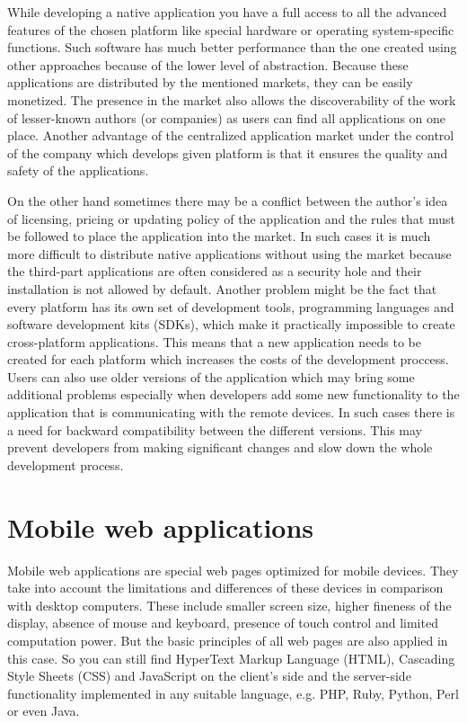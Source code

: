 \documentclass[12pt,oneside,final]{fithesis2}
\begin{document}
While developing a native application you have a full access to all the advanced features of the chosen platform like special hardware or operating system-specific functions.
Such software has much better performance than the one created using other approaches because of the lower level of abstraction.
Because these applications are distributed by the mentioned markets, they can be easily monetized.
The presence in the market also allows the discoverability of the work of lesser-known authors (or companies) as users can find all applications on one place.
Another advantage of the centralized application market under the control of the company which develops given platform is that it ensures the quality and safety of the applications.

On the other hand sometimes there may be a conflict between the author's idea of licensing, pricing or updating policy of the application and the rules that must be followed to place the application into the market.
In such cases it is much more difficult to distribute native applications without using the market because the third-part applications are often considered as a security hole and their installation is not allowed by default.
Another problem might be the fact that every platform has its own set of development tools, programming languages and software development kits (SDKs), which make it practically impossible to create cross-platform applications.
This means that a new application needs to be created for each platform which increases the costs of the development proccess.
Users can also use older versions of the application which may bring some additional problems especially when developers add some new functionality to the application that is communicating with the remote devices.
In such cases there is a need for backward compatibility between the different versions.
This may prevent developers from making significant changes and slow down the whole development process.

\section{Mobile web applications}
Mobile web applications are special web pages optimized for mobile devices.
They take into account the limitations and differences of these devices in comparison with desktop computers.
These include smaller screen size, higher fineness of the display, absence of mouse and keyboard, presence of touch control and limited computation power.
But the basic principles of all web pages are also applied in this case.
So you can still find HyperText Markup Language (HTML), Cascading Style Sheets (CSS) and JavaScript on the client's side and the server-side functionality implemented in any suitable language, e.g. PHP, Ruby, Python, Perl or even Java.
\end{document}
